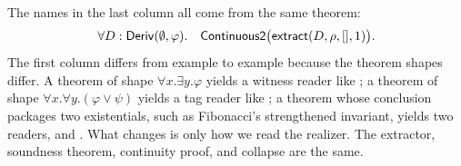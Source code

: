 \documentclass[11pt]{article}
\begin{document}
The names in the last column all come from the same theorem:
\[
  \forall D:\mathsf{Deriv}(\emptyset,\varphi).\quad
  \mathsf{Continuous2}\bigl(\mathsf{extract}(D,\rho,[],1)\bigr).
\]
The first column differs from example to example because the theorem shapes
differ. A theorem of shape $\forall x.\exists y.\varphi$ yields a witness
reader like ; a theorem of shape
$\forall x.\forall y.(\varphi\lor\psi)$ yields a tag reader like
; a theorem whose conclusion packages two existentials, such as
Fibonacci's strengthened invariant, yields two readers,  and
. What changes is only how we read the realizer. The extractor,
soundness theorem, continuity proof, and \CtQ collapse are the same.



\end{document}
